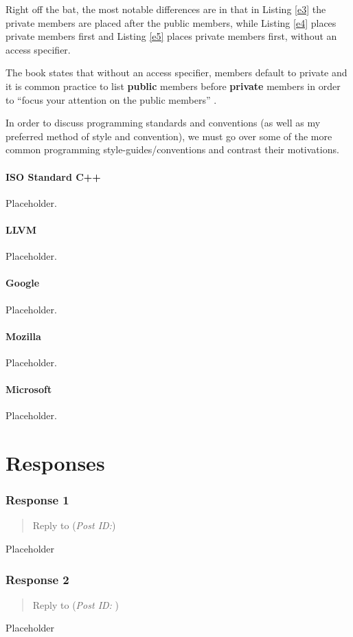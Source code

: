 \documentclass[12pt]{article}
\theoremstyle{definition}
\theoremstyle{plain}
\begin{document}
        Right off the bat, the most notable differences are in that in Listing
          \ref{e3} the private members are placed after the public members,
          while Listing \ref{e4} places private members first and Listing
          \ref{e5} places private members first, without an access specifier.

        The book states that without an access specifier, members default to
          private and it is common practice to list \textbf{public} members
          before \textbf{private} members in order to ``focus your attention
          on the public members'' \autocite{malik_2015}.

        In order to discuss programming standards and conventions (as well as
          my preferred method of style and convention), we must go over some of
          the more common programming style-guides/conventions and contrast
          their motivations.

        \subsection{ISO Standard C++}
          Placeholder.

        \subsection{LLVM}
          Placeholder.

        \subsection{Google}
          Placeholder.

        \subsection{Mozilla}
          Placeholder.

        \subsection{Microsoft}
          Placeholder.


  \newpage
  \part{Responses}

    \section{Response 1}
      \begin{quote}
        Reply to \textbf{} (\textit{Post ID:})
      \end{quote}
      Placeholder

    \section{Response 2}
      \begin{quote}
        Reply to \textbf{} (\textit{Post ID: }) 
      \end{quote}
      Placeholder

  \newpage
  \printbibliography[
    heading=bibintoc,
    title={Bibliography}
  ]
\end{document}
